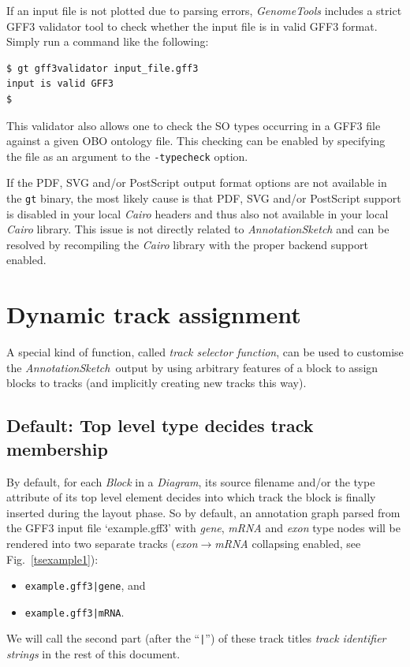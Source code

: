 \documentclass[a4paper]{scrreprt}
\newcommand{\AnnotationSketch}{\emph{AnnotationSketch}\ }
\begin{document}
If an input file is not plotted due to parsing errors, \emph{GenomeTools} includes a strict GFF3 validator tool to check whether the input file is in valid GFF3 format. Simply run a command like the following:
\small
\medskip
\begin{verbatim}
$ gt gff3validator input_file.gff3
input is valid GFF3
$
\end{verbatim}
\normalsize
\medskip
This validator also allows one to check the SO types occurring in a GFF3 file against a given OBO ontology file. This checking can be enabled by specifying the file as an argument to the \texttt{-typecheck} option.

If the PDF, SVG and/or PostScript output format options are not available in the \texttt{gt} binary, the most likely cause is that PDF, SVG and/or PostScript support is disabled in your local \emph{Cairo} headers and thus also not available in your local \emph{Cairo} library. This issue is not directly related to \emph{AnnotationSketch} and can be resolved by recompiling the \emph{Cairo} library with the proper backend support enabled.

\section{Dynamic track assignment}
A special kind of function, called \emph{track selector function}, can be used to customise the \AnnotationSketch output by using arbitrary features of a block to assign blocks to tracks (and implicitly creating new tracks this way).

\subsection{Default: Top level type decides track membership}
By default, for each \emph{Block} in a \emph{Diagram}, its source filename and/or the type attribute of its top level element decides into which track the block is finally inserted during the layout phase. So by default, an annotation graph parsed from the GFF3 input file `example.gff3' with \emph{gene}, \emph{mRNA} and \emph{exon} type nodes will be rendered into two separate tracks (\emph{exon}$\to$\emph{mRNA} collapsing enabled, see Fig.~\ref{tsexample1}):

\begin{itemize}
    \item \texttt{example.gff3|gene}, and
    \item \texttt{example.gff3|mRNA}.
\end{itemize}
We will call the second part (after the ``\texttt{|}'') of these track titles \emph{track identifier strings} in the rest of this document.
\end{document}
